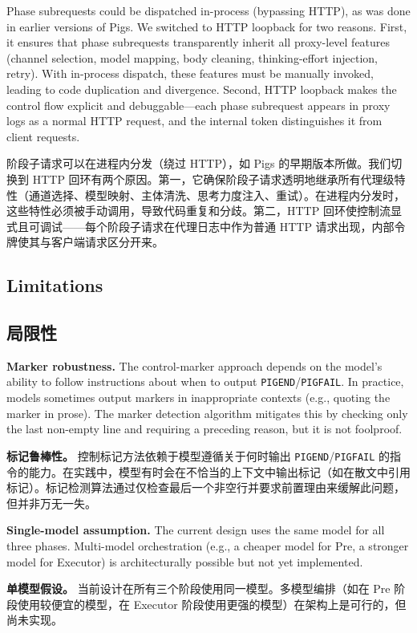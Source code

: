 Phase subrequests could be dispatched in-process (bypassing HTTP), as was done in earlier versions of Pigs. We switched to HTTP loopback for two reasons. First, it ensures that phase subrequests transparently inherit all proxy-level features (channel selection, model mapping, body cleaning, thinking-effort injection, retry). With in-process dispatch, these features must be manually invoked, leading to code duplication and divergence. Second, HTTP loopback makes the control flow explicit and debuggable---each phase subrequest appears in proxy logs as a normal HTTP request, and the internal token distinguishes it from client requests.
\begin{chinese}
阶段子请求可以在进程内分发（绕过 HTTP），如 Pigs 的早期版本所做。我们切换到 HTTP 回环有两个原因。第一，它确保阶段子请求透明地继承所有代理级特性（通道选择、模型映射、主体清洗、思考力度注入、重试）。在进程内分发时，这些特性必须被手动调用，导致代码重复和分歧。第二，HTTP 回环使控制流显式且可调试——每个阶段子请求在代理日志中作为普通 HTTP 请求出现，内部令牌使其与客户端请求区分开来。
\end{chinese}

\subsection{Limitations}
\begin{chinese}
\subsection{局限性}
\end{chinese}

\textbf{Marker robustness.} The control-marker approach depends on the model's ability to follow instructions about when to output \texttt{PIGEND}/\texttt{PIGFAIL}. In practice, models sometimes output markers in inappropriate contexts (e.g., quoting the marker in prose). The marker detection algorithm mitigates this by checking only the last non-empty line and requiring a preceding reason, but it is not foolproof.
\begin{chinese}
\textbf{标记鲁棒性。} 控制标记方法依赖于模型遵循关于何时输出 \texttt{PIGEND}/\texttt{PIGFAIL} 的指令的能力。在实践中，模型有时会在不恰当的上下文中输出标记（如在散文中引用标记）。标记检测算法通过仅检查最后一个非空行并要求前置理由来缓解此问题，但并非万无一失。
\end{chinese}

\textbf{Single-model assumption.} The current design uses the same model for all three phases. Multi-model orchestration (e.g., a cheaper model for Pre, a stronger model for Executor) is architecturally possible but not yet implemented.
\begin{chinese}
\textbf{单模型假设。} 当前设计在所有三个阶段使用同一模型。多模型编排（如在 Pre 阶段使用较便宜的模型，在 Executor 阶段使用更强的模型）在架构上是可行的，但尚未实现。
\end{chinese}


